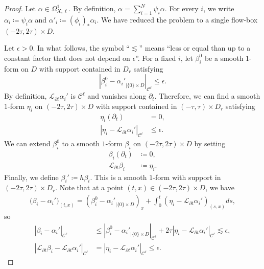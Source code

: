 \documentclass[letterpaper, 11pt]{article}
\numberwithin{equation}{section}
\begin{document}
\begin{proof}
Let $\alpha \in \Omega^1_{X, \ell}$. By definition, $\alpha = \sum_{i=1}^N \psi_i \alpha$. For every $i$, we write $\alpha_i \coloneqq \psi_i \alpha$ and $\alpha'_i \coloneqq (\phi_i)_* \alpha_i$. We have reduced the problem to a single flow-box $(-2\tau, 2\tau) \times D$.

Let $\epsilon > 0$. In what follows, the symbol ``$\lesssim$'' means ``less or equal than up to a constant factor that does not depend on $\epsilon$''. For a fixed $i$, let $\beta^0_i$ be a smooth $1$-form on $D$ with support contained in  $D_r$ satisfying
$$\left \vert \beta^0_i - {\alpha_i'}_{\vert \{0\} \times D} \right \vert_{\mathcal{C}^\ell} \leq \epsilon.$$ 
By definition, $\mathcal{L}_{\partial t} \alpha_i'$ is $\mathcal{C}^\ell$ and vanishes along $\partial_t$. Therefore, we can find a smooth $1$-form $\eta_i$ on $(-2 \tau, 2 \tau)\times D$ with support contained in $(-\tau, \tau) \times D_r$ satisfying
\begin{align*}
\eta_i(\partial_t) &= 0, \\
\left  \vert \eta_i - \mathcal{L}_{\partial t} \alpha_i' \right \vert_{\mathcal{C}^\ell} &\leq \epsilon.
\end{align*}
We can extend $\beta^0_i$ to a smooth $1$-form $\beta_i$ on $(-2\tau, 2\tau) \times D$ by setting
\begin{align*}
\beta_i(\partial_t) &\coloneqq 0, \\
\mathcal{L}_{\partial t} \beta_i &\coloneqq \eta_i.
\end{align*} 
Finally, we define $\beta_i' \coloneqq h  \beta_i$. This is a smooth $1$-form with support in $(-2\tau, 2\tau) \times D_r$. Note that at a point $(t,x) \in (-2\tau, 2\tau) \times D$, we have
\begin{align*}
\big(\beta_i - \alpha_i'\big)_{(t,x)} = \left(\beta_i^0 - {\alpha_i'}_{\vert \{0\} \times D}\right)_{x} + \int_0^t \left( \eta_i - \mathcal{L}_{\partial t} \alpha_i' \right)_{(s,x)} ds,
\end{align*}
so
\begin{align*}
\left \vert \beta_i - \alpha_i'  \right \vert_{\mathcal{C}^\ell} &\leq \left \vert \beta_i^0 - {\alpha_i'}_{\vert \{0\} \times D} \right \vert_{\mathcal{C}^\ell} + 2\tau \left \vert \eta_i - \mathcal{L}_{\partial t} \alpha_i' \right \vert_{\mathcal{C}^\ell} \lesssim \epsilon, \\
\left \vert \mathcal{L}_{\partial t} \beta_i -  \mathcal{L}_{\partial t} \alpha_i' \right \vert_{\mathcal{C}^\ell} &=  \left \vert \eta_i -  \mathcal{L}_{\partial t} \alpha_i' \right \vert_{\mathcal{C}^\ell} \leq \epsilon.

\end{align*}
\end{proof}
\end{document}
